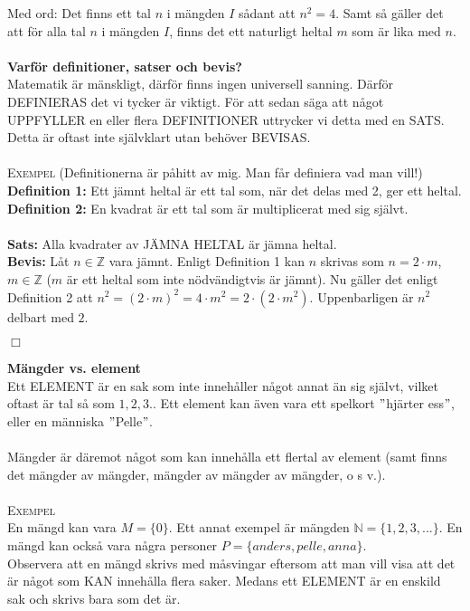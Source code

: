 \documentclass{article}
\begin{document}
Med ord: Det finns ett tal $n$ i mängden $I$ sådant att $n^2=4$. Samt så gäller det att för alla tal $n$ i mängden $I$, finns det ett naturligt heltal $m$ som är lika med $n$.
\\ \\
\textbf{Varför definitioner, satser och bevis?}
\\
Matematik är mänskligt, därför finns ingen universell sanning. Därför DEFINIERAS det vi tycker är viktigt. För att sedan säga att något UPPFYLLER en eller flera DEFINITIONER uttrycker vi detta med en SATS. Detta är oftast inte självklart utan behöver BEVISAS.
\\ \\
\textsc{Exempel} (Definitionerna är påhitt av mig. Man får definiera vad man vill!)
\\
\textbf{Definition 1:} Ett jämnt heltal är ett tal som, när det delas med 2, ger ett heltal.
\\
\textbf{Definition 2:} En kvadrat är ett tal som är multiplicerat med sig självt.
\\ \\
\textbf{Sats:} Alla kvadrater av JÄMNA HELTAL är jämna heltal.
\\
\textbf{Bevis:} Låt $n\in\mathbb{Z}$ vara jämnt. Enligt Definition 1 kan $n$ skrivas som $n=2\cdot m$, \  $m\in\mathbb{Z}$ ($m$ är ett heltal som inte nödvändigtvis är jämnt). Nu gäller det enligt Definition 2 att $n^2=(2\cdot m)^2=4\cdot m^2=2\cdot(2\cdot m^2)$. Uppenbarligen är $n^2$ delbart med $2$.
\begin{flushright}
$\Box$
\end{flushright}
\textbf{Mängder vs. element}
\\
Ett ELEMENT är en sak som inte innehåller något annat än sig självt, vilket oftast är tal så som $1,2,3..$  Ett element kan även vara ett spelkort $"$hjärter ess$"$, eller en människa $"$Pelle$"$. 
\\ \\
Mängder är däremot något som kan innehålla ett flertal av element (samt finns det mängder av mängder, mängder av mängder av mängder, o s v.).
\\ \\
\textsc{Exempel}
\\
En mängd kan vara $M=\{0\}$. Ett annat exempel är mängden $\mathbb{N}=\{1,2,3,...\}$. En mängd kan också vara några personer $P=\{anders,pelle,anna\}$.
\\
Observera att en mängd skrivs med måsvingar eftersom att man vill visa att det är något som KAN innehålla flera saker. Medans ett ELEMENT är en enskild sak och skrivs bara som det är.
\end{document}
